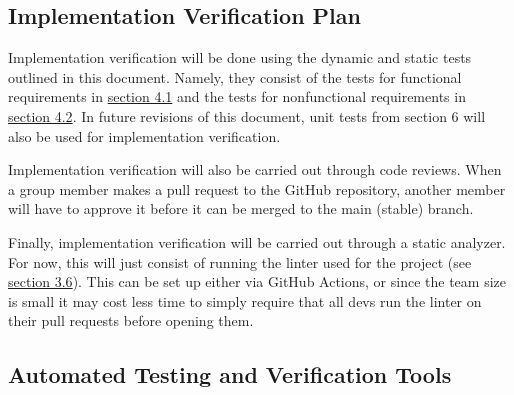 \documentclass[12pt, titlepage]{article}
\begin{document}
\subsection{Implementation Verification Plan}

  Implementation verification will be done using the dynamic and static tests outlined in this document. Namely, they consist of the tests for functional requirements in \hyperref[s5.1]{section 4.1} and the tests for nonfunctional requirements in \hyperref[s5.2]{section 4.2}. In future revisions of this document, unit tests from section 6 will also be used for implementation verification.
  
  Implementation verification will also be carried out through code reviews. When a group member makes a pull request to the GitHub repository, another member will have to approve it before it can be merged to the main (stable) branch.
  
  Finally, implementation verification will be carried out through a static analyzer. For now, this will just consist of running the linter used for the project (see \hyperref[s4.6]{section 3.6}). This can be set up either via GitHub Actions, or since the team size is small it may cost less time to simply require that all devs run the linter on their pull requests before opening them.

\subsection{Automated Testing and Verification Tools}
\label{s4.6}
\end{document}
